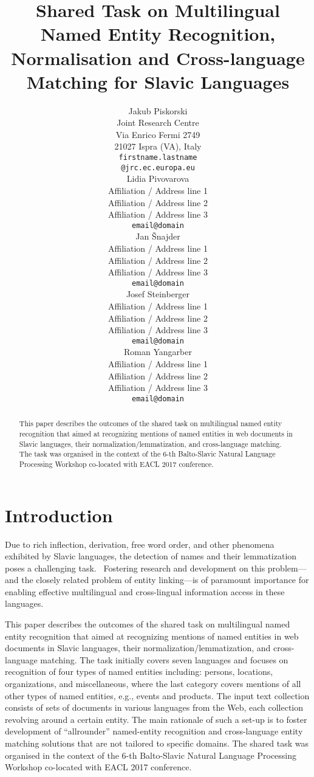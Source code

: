 \documentclass[11pt]{article}
\title{Shared Task on Multilingual Named Entity Recognition, Normalisation and Cross-language Matching for Slavic Languages}
\author{Jakub Piskorski \\
  Joint Research Centre \\
	Via Enrico Fermi 2749 \\
  21027 Ispra (VA), Italy \\
  {\tt firstname.lastname} \\
	{\tt @jrc.ec.europa.eu} \\\And
  Lidia Pivovarova \\
  Affiliation / Address line 1 \\
  Affiliation / Address line 2 \\
  Affiliation / Address line 3 \\
  {\tt email@domain} \\\And 
	Jan Šnajder \\
  Affiliation / Address line 1 \\
  Affiliation / Address line 2 \\
  Affiliation / Address line 3 \\
  {\tt email@domain} \\\And	
	Josef Steinberger \\
  Affiliation / Address line 1 \\
  Affiliation / Address line 2 \\
  Affiliation / Address line 3 \\
  {\tt email@domain} \\\And
	Roman Yangarber \\
  Affiliation / Address line 1 \\
  Affiliation / Address line 2 \\
  Affiliation / Address line 3 \\
  {\tt email@domain} 
	\\}
\date{}
\begin{document}
\maketitle
\begin{abstract}
This paper describes the outcomes of the shared task on multilingual named entity recognition 
that aimed at recognizing mentions of named entities in web documents in Slavic languages, 
their normalization/lemmatization, and cross-language matching. The task was organised in 
the context of the 6-th Balto-Slavic Natural Language Processing Workshop co-located with 
EACL 2017 conference. 
\end{abstract}

\section{Introduction}
\label{sec:intro}

Due to rich inflection, derivation, free word order, and other phenomena
exhibited by Slavic languages, the detection of names and their
lemmatization poses a challenging task.~\cite{Przepiorkowski:2007:SIE:1567545.1567547,journals/ir/PiskorskiWS09} 
Fostering research and development on this problem---and the closely related problem of entity
linking---is of paramount importance for enabling effective multilingual
and cross-lingual information access in these languages.

This paper describes the outcomes of the shared task on multilingual named 
entity recognition that aimed at recognizing mentions of named entities in web documents 
in Slavic languages, their normalization/lemmatization, and cross-language matching.
The task initially covers seven languages and focuses on recognition of four types of 
named entities including: persons, locations, organizations, and miscellaneous,
where the last category covers mentions of all other types of named entities, e.g., events and products.
The input text collection consists of sets of documents in various languages from the 
Web, each collection revolving around a certain entity. The main rationale of such a 
set-up is to foster development of ``allrounder'' named-entity recognition and 
cross-language entity matching solutions that are not tailored to specific domains.
The shared task was organised in the context of the 6-th Balto-Slavic Natural Language Processing 
Workshop co-located with EACL 2017 conference. 
\end{document}
